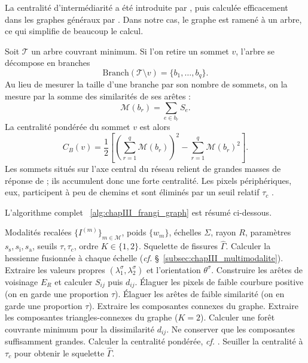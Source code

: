 La centralité d'intermédiarité a été introduite par  \cite{Freeman1977}, puis calculée efficacement dans les graphes généraux par  \cite{Brandes2001}. Dans notre cas, le graphe est ramené à un arbre, ce qui simplifie de beaucoup le calcul.

Soit $\mathcal T$ un arbre couvrant minimum. Si l'on retire un sommet $v$, l'arbre se décompose en branches
\[
    \mathrm{Branch}(\mathcal T\setminus v)=\{b_1,\ldots,b_q\}.
\]
Au lieu de mesurer la taille d'une branche par son nombre de sommets, on la mesure par la somme des similarités de ses arêtes :
\begin{equation}
    \mathcal M(b_r)=\sum_{e\in b_r} S_e.
\end{equation}
La centralité pondérée du sommet $v$ est alors
\begin{equation}
    C_B(v)
    =
    \frac12
    \left[
        \left(\sum_{r=1}^q \mathcal M(b_r)\right)^2
        -
        \sum_{r=1}^q \mathcal M(b_r)^2
    \right].
    \label{eq:chapIII_betweenness}
\end{equation}
Les sommets situés sur l'axe central du réseau relient de grandes masses de réponse de \Frangi{} ; ils accumulent donc une forte centralité. Les pixels périphériques, eux, participent à peu de chemins et sont éliminés par un seuil relatif $\tau_c$ \cite{BibiISPRS}.

L'algorithme complet \Alg~\ref{alg:chapIII_frangi_graph} est résumé ci-dessous.

\begin{algorithm}[H]
\caption{Extraction d'un squelette par graphe de \Frangi{} généralisé}
\label{alg:chapIII_frangi_graph}
\begin{algorithmic}[1]
\Require Modalités recalées $\{I^{(m)}\}_{m\in\mathcal M}$, poids $\{w_m\}$, échelles $\Sigma$, rayon $R$, paramètres $s_{\mathrm{s}},s_{\mathrm{i}},s_{\mathrm{a}}$, seuils $\tau,\tau_c$, ordre $K\in\{1,2\}$.
\Return Squelette de fissures $\widehat\Gamma$.
\State Calculer la hessienne fusionnée à chaque échelle (\emph{cf.} \S~\ref{subsec:chapIII_multimodalite}).
\State Extraire les valeurs propres $(\lambda_1^\sigma,\lambda_2^\sigma)$ et l'orientation $\theta^\sigma$.
\State Construire les arêtes de voisinage $E_R$ et calculer $S_{ij}$ puis $d_{ij}$.
\State Élaguer les pixels de faible courbure positive (on en garde une proportion $\tau$).
\State Élaguer les arêtes de faible similarité (on en garde une proportion $\tau$).
    \State Extraire les composantes connexes du graphe.
\Else
    \State Extraire les composantes triangles-connexes du graphe ($K=2$).
\EndIf
\State Calculer une forêt couvrante minimum pour la dissimilarité $d_{ij}$.
\State Ne conserver que les composantes suffisamment grandes.
\State Calculer la centralité pondérée, \emph{cf.} .
\State Seuiller la centralité à $\tau_c$ pour obtenir le squelette $\widehat\Gamma$.
\end{algorithmic}
\end{algorithm}

